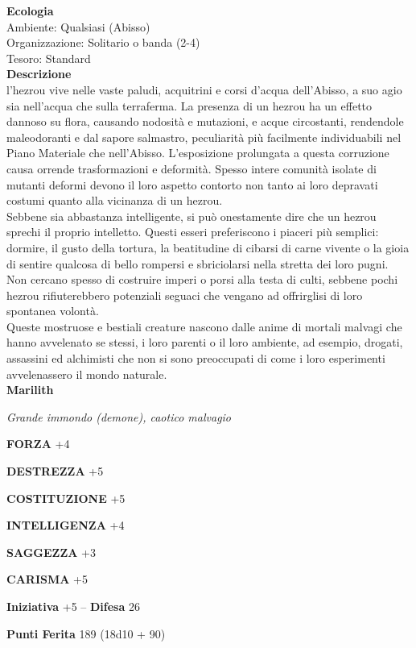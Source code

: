 \begin{multicols}{2}
\textbf{Ecologia}\\
Ambiente: Qualsiasi (Abisso)\\
Organizzazione: Solitario o banda (2-4)\\
Tesoro: Standard\\
\textbf{Descrizione}\\
l'hezrou vive nelle vaste paludi, acquitrini e corsi d'acqua dell'Abisso, a suo agio sia nell'acqua che sulla terraferma. La presenza di un hezrou ha un effetto dannoso su flora, causando nodosità e mutazioni, e acque circostanti, rendendole maleodoranti e dal sapore salmastro, peculiarità più facilmente individuabili nel Piano Materiale che nell'Abisso. L'esposizione prolungata a questa corruzione causa orrende trasformazioni e deformità. Spesso intere comunità isolate di mutanti deformi devono il loro aspetto contorto non tanto ai loro depravati costumi quanto alla vicinanza di un hezrou.\\
Sebbene sia abbastanza intelligente, si può onestamente dire che un hezrou sprechi il proprio intelletto. Questi esseri preferiscono i piaceri più semplici: dormire, il gusto della tortura, la beatitudine di cibarsi di carne vivente o la gioia di sentire qualcosa di bello rompersi e sbriciolarsi nella stretta dei loro pugni. Non cercano spesso di costruire imperi o porsi alla testa di culti, sebbene pochi hezrou rifiuterebbero potenziali seguaci che vengano ad offrirglisi di loro spontanea volontà.\\
Queste mostruose e bestiali creature nascono dalle anime di mortali malvagi che hanno avvelenato se stessi, i loro parenti o il loro ambiente, ad esempio, drogati, assassini ed alchimisti che non si sono preoccupati di come i loro esperimenti avvelenassero il mondo naturale.\\


\medskip{}\textbf{Marilith}

\emph{Grande immondo (demone), caotico malvagio}

\textbf{FORZA} +4

\textbf{DESTREZZA} +5

\textbf{COSTITUZIONE} +5

\textbf{INTELLIGENZA} +4

\textbf{SAGGEZZA} +3

\textbf{CARISMA} +5

\textbf{Iniziativa} +5 -- \textbf{Difesa} 26

\textbf{Punti Ferita} 189 (18d10 + 90)


\end{multicols}
